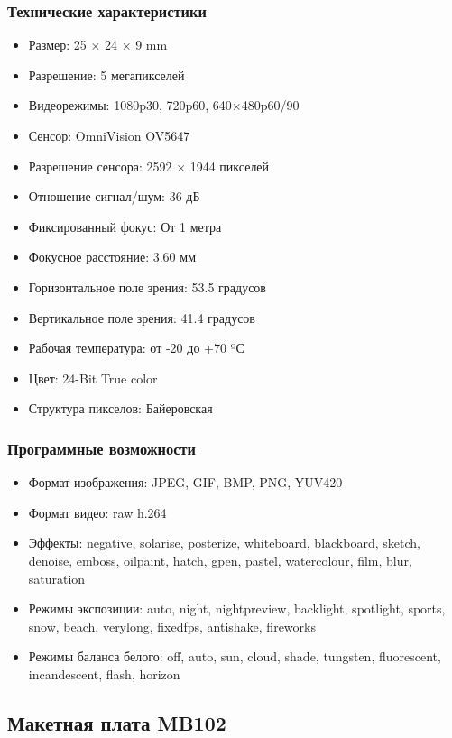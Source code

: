 \documentclass[a4paper,11pt]{article}
\begin{document}
\subsubsection{Технические характеристики}
\begin{itemize}
  \item  Размер: 25 × 24 × 9 mm
  \item Разрешение: 5 мегапикселей
  \item Видеорежимы: 1080p30, 720p60, 640×480p60/90	
  \item Сенсор: OmniVision OV5647	
  \item Разрешение сенсора: 2592 × 1944 пикселей	
  \item Отношение сигнал/шум: 36 дБ
  \item Фиксированный фокус: От 1 метра
  \item Фокусное расстояние: 3.60 мм
  \item Горизонтальное поле зрения: 53.5 градусов
  \item Вертикальное поле зрения: 41.4 градусов
  \item Рабочая температура: от -20 до +70 ºС
  \item Цвет: 24-Bit True color
  \item Структура пикселов: Байеровская
\end{itemize}

\subsubsection{Программные возможности}
\begin{itemize}
  \item Формат изображения: JPEG, GIF, BMP, PNG, YUV420
  \item Формат видео: raw h.264
  \item Эффекты: negative, solarise, posterize, whiteboard, blackboard, sketch, denoise, emboss, oilpaint, hatch, gpen, pastel, watercolour, film, blur, saturation
  \item Режимы экспозиции: auto, night, nightpreview, backlight, spotlight, sports, snow, beach, verylong, fixedfps, antishake, fireworks
  \item Режимы баланса белого: off, auto, sun, cloud, shade, tungsten, fluorescent, incandescent, flash, horizon
\end{itemize}

\subsection{Макетная плата MB102}
\end{document}
